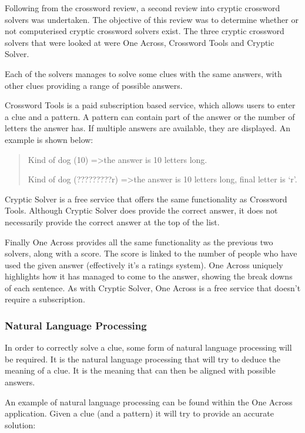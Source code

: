 Following from the crossword review, a second review into cryptic crossword 
solvers was undertaken. The objective of this review was to determine whether 
or not computerised cryptic crossword solvers exist. The three cryptic 
crossword solvers that were looked at were One Across, Crossword Tools and 
Cryptic Solver.

Each of the solvers manages to solve some clues with the same answers, with 
other clues providing a range of possible answers.

Crossword Tools \citep{crosswordtools} is a paid subscription based service, 
which allows users to enter a clue and a pattern. A pattern can contain part of
the answer or the number of letters the answer has. If multiple answers are 
available, they are displayed. An example is shown below:

\begin{quote}
Kind of dog (10) =\textgreater the answer is 10 letters long.

Kind of dog (?????????r) =\textgreater the answer is 10 letters long, final 
letter is `r'.
\end{quote}

Cryptic Solver \citep{crypticsolver} is a free service that offers the same 
functionality as Crossword Tools. Although Cryptic Solver does provide the 
correct answer, it does not necessarily provide the correct answer at the top 
of the list.

Finally One Across \citep{oneacross} provides all the same functionality as the
previous two solvers, along with a score. The score is linked to the number of 
people who have used the given answer (effectively it's a ratings system). One 
Across uniquely highlights how it has managed to come to the answer, showing 
the break downs of each sentence. As with Cryptic Solver, One Across is a free 
service that doesn't require a subscription.


\subsubsection{Natural Language Processing}

In order to correctly solve a clue, some form of natural language processing 
will be required. It is the natural language processing that will try to deduce 
the meaning of a clue. It is the meaning that can then be aligned with possible 
answers.

An example of natural language processing can be found within the One Across 
application. Given a clue (and a pattern) it will try to provide an accurate 
solution:

